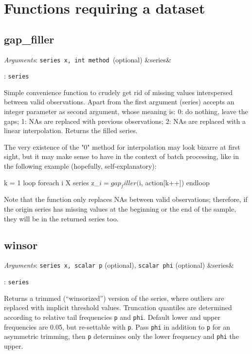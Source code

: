 \documentclass[11pt,english]{article}
\newcommand{\ArgRet}[2]{%
  {\it Arguments}: {#1}%
  \ifx&#2&%
  \else
  \par\smallskip\noindent {\it Return type}: \texttt{#2}
  \fi%
  \par\medskip\par%
  }
\begin{document}

\section{Functions requiring a dataset}

\subsection{gap\_filler}

\ArgRet{\texttt{series x, int method }(optional)}{series}

Simple convenience function to crudely get rid of missing values
interspersed between valid observations. Apart from the first argument
(series) accepts an integer parameter as second argument, whose
meaning is: 0: do nothing, leave the gaps; 1: NAs are replaced with
previous observations; 2: NAs are replaced with a linear
interpolation. Returns the filled series.

The very existence of the "0" method for interpolation may look
bizarre at first sight, but it may make sense to have in the context
of batch processing, like in the following example (hopefully,
self-explanatory):
\begin{code}
k = 1
loop foreach i X
   series z_$i = gap_filler($i, action[k++])
endloop
\end{code}

Note that the function only replaces NAs between valid observations;
therefore, if the origin series has missing values at the beginning or
the end of the sample, they will be in the returned series too.

\subsection{winsor}

\ArgRet{\texttt{series x, scalar p} (optional), \texttt{scalar
phi} (optional)}{series}

Returns a trimmed (``winsorized'') version
of the series, where outliers are replaced with implicit threshold
values. Truncation quantiles are determined according to relative
tail frequencies \texttt{p} and \texttt{phi}. Default lower and upper
frequencies are 0.05, but re-settable with \texttt{p}. Pass \texttt{phi}
in addition to \texttt{p} for an asymmetric trimming, then \texttt{p}
determines only the lower frequency and \texttt{phi} the upper. 
\end{document}
